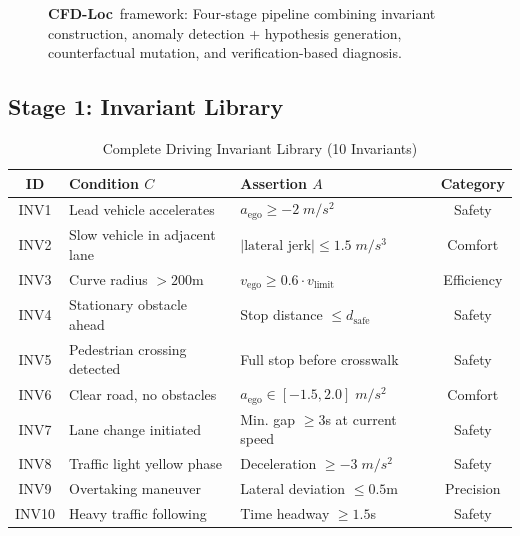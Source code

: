 \documentclass[conference]{IEEEtran}
\theoremstyle{plain}
\newcommand{\methodname}{\textbf{CFD-Loc}}
\begin{document}
\begin{figure}[t]
\caption{\methodname\ framework: Four-stage pipeline combining invariant construction, anomaly detection + hypothesis generation, counterfactual mutation, and verification-based diagnosis.}
\label{fig:pipeline}
\end{figure}

\subsection{Stage 1: Invariant Library}
\begin{table}[h]
\centering
\caption{Complete Driving Invariant Library (10 Invariants)}
\label{tab:invariants}
\small
\begin{tabular}{cp{2.8cm}p{3.5cm}c}
\toprule
\textbf{ID} & \textbf{Condition $C$} & \textbf{Assertion $A$} & \textbf{Category}\\\midrule
INV1 & Lead vehicle accelerates & $a_{\text{ego}} \geq -2\;\si{m/s^2}$ & Safety\\
INV2 & Slow vehicle in adjacent lane & $|\text{lateral jerk}| \leq 1.5\;\si{m/s^3}$ & Comfort\\
INV3 & Curve radius $> 200$m & $v_{\text{ego}} \geq 0.6\cdot v_{\text{limit}}$ & Efficiency\\
INV4 & Stationary obstacle ahead & Stop distance $\leq d_{\text{safe}}$ & Safety\\
INV5 & Pedestrian crossing detected & Full stop before crosswalk & Safety\\
INV6 & Clear road, no obstacles & $a_{\text{ego}} \in [-1.5, 2.0]\;\si{m/s^2}$ & Comfort\\
INV7 & Lane change initiated & Min. gap $\geq 3$s at current speed & Safety\\
INV8 & Traffic light yellow phase & Deceleration $\geq -3\;\si{m/s^2}$ & Safety\\
INV9 & Overtaking maneuver & Lateral deviation $\leq 0.5$m & Precision\\
INV10 & Heavy traffic following & Time headway $\geq 1.5$s & Safety\\
\bottomrule
\end{tabular}
\end{table}
\end{document}
